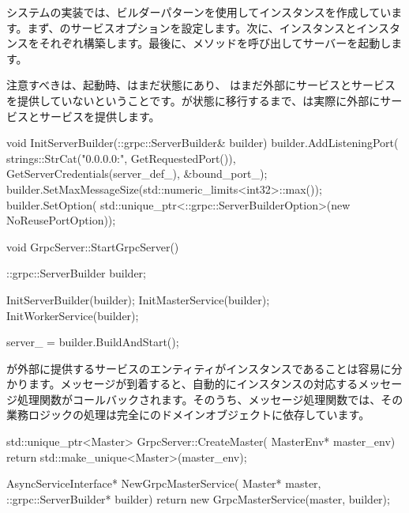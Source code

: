 \begin{content}
システムの実装では、ビルダーパターンを使用してインスタンスを作成しています。まず、のサービスオプションを設定します。次に、インスタンスとインスタンスをそれぞれ構築します。最後に、メソッドを呼び出してサーバーを起動します。

注意すべきは、起動時、はまだ状態にあり、
はまだ外部にサービスとサービスを提供していないということです。が状態に移行するまで、は実際に外部にサービスとサービスを提供します。

\begin{leftbar}
\begin{c++}
void InitServerBuilder(::grpc::ServerBuilder& builder) {
  builder.AddListeningPort(
    strings::StrCat("0.0.0.0:", GetRequestedPort()),
    GetServerCredentials(server_def_), &bound_port_);
  builder.SetMaxMessageSize(std::numeric_limits<int32>::max());
  builder.SetOption(
      std::unique_ptr<::grpc::ServerBuilderOption>(new NoReusePortOption));
}

void GrpcServer::StartGrpcServer() {
  ::grpc::ServerBuilder builder;

  InitServerBuilder(builder);
  InitMasterService(builder);
  InitWorkerService(builder);

  server_ = builder.BuildAndStart();  
}
\end{c++}
\end{leftbar}

が外部に提供するサービスのエンティティがインスタンスであることは容易に分かります。メッセージが到着すると、自動的にインスタンスの対応するメッセージ処理関数がコールバックされます。そのうち、メッセージ処理関数では、その業務ロジックの処理は完全にのドメインオブジェクトに依存しています。

\begin{leftbar}
\begin{c++}
std::unique_ptr<Master> GrpcServer::CreateMaster(
    MasterEnv* master_env) {
  return std::make_unique<Master>(master_env);
}

AsyncServiceInterface* NewGrpcMasterService(
    Master* master, ::grpc::ServerBuilder* builder) {
  return new GrpcMasterService(master, builder);
}


\end{c++}
\end{leftbar}
\end{content}
